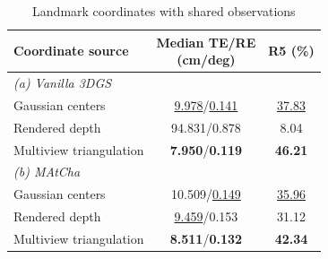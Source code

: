 \begin{table}[!t]
\centering
\footnotesize
\setlength{\tabcolsep}{2pt}
\renewcommand{\arraystretch}{1.10}
\caption{Landmark coordinates with shared observations}\label{tab:t5}
\begin{tabular*}{\linewidth}{@{\extracolsep{\fill}}lcc@{}}
\toprule
Coordinate source & \shortstack{Median TE/RE\\(cm/deg)} & R5 (\%) \\
\midrule
\multicolumn{3}{l}{\textit{(a) Vanilla 3DGS}} \\
Gaussian centers & \underline{9.978}/\underline{0.141} & \underline{37.83} \\
Rendered depth & 94.831/0.878 & 8.04 \\
Multiview triangulation & \textbf{7.950}/\textbf{0.119} & \textbf{46.21} \\
\midrule
\multicolumn{3}{l}{\textit{(b) MAtCha}} \\
Gaussian centers & 10.509/\underline{0.149} & \underline{35.96} \\
Rendered depth & \underline{9.459}/0.153 & 31.12 \\
Multiview triangulation & \textbf{8.511}/\textbf{0.132} & \textbf{42.34} \\
\bottomrule
\end{tabular*}
\end{table}

